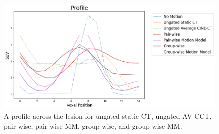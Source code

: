             \begin{figure}
                \centering
                
                \includegraphics[width=1.0\linewidth]{figures/motion_correction_1_results_3_profile.png}
                
                \captionsetup{singlelinecheck=false}
                \caption{
                    A profile across the lesion for ungated static \gls{CT}, ungated \gls{AV-CCT}, pair-wise, pair-wise \gls{MM}, group-wise, and group-wise \gls{MM}.
                }
                \label{fig:comparison_of_motion_correction_methods_incorporating_motion_modelling_for_pet_ct_using_a_single_breath_hold_attenuation_map_results_profile}
            \end{figure}
            
